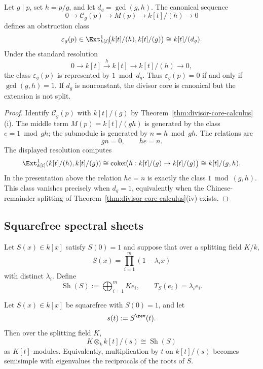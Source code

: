 \begin{corollary}
\label{cor:repeated-roots-extension}
Let \(g\mid p\), set \(h=p/g\), and let \(d_g=\gcd(g,h)\).
The canonical sequence
\[
0\longrightarrow \mathcal C_g(p)\longrightarrow M(p)\longrightarrow k[t]/(h)\longrightarrow 0
\]
defines an obstruction class
\[
\varepsilon_g(p)\in
\Ext^1_{k[t]}\!\bigl(k[t]/(h),k[t]/(g)\bigr)
\cong k[t]/(d_g).
\]
Under the standard resolution
\[
0\longrightarrow k[t]\xrightarrow{\;h\;}k[t]\longrightarrow k[t]/(h)\longrightarrow 0,
\]
the class \(\varepsilon_g(p)\) is represented by \(1\bmod d_g\).
Thus \(\varepsilon_g(p)=0\) if and only if \(\gcd(g,h)=1\).
If \(d_g\) is nonconstant, the divisor core is canonical but the extension is not split.
\end{corollary}

\begin{proof}
Identify \(\mathcal C_g(p)\) with \(k[t]/(g)\) by
Theorem~\ref{thm:divisor-core-calculus}\textup{(i)}.
The middle term \(M(p)=k[t]/(gh)\) is generated by the class \(e=1\bmod gh\);
the submodule is generated by \(n=h\bmod gh\).
The relations are
\[
g n=0,\qquad h e=n.
\]
The displayed resolution computes
\[
\Ext^1_{k[t]}(k[t]/(h),k[t]/(g))
\cong \operatorname{coker}\!\bigl(h:k[t]/(g)\to k[t]/(g)\bigr)
\cong k[t]/(g,h).
\]
In the presentation above the relation \(h e=n\) is exactly the class
\(1\bmod (g,h)\).
This class vanishes precisely when \(d_g=1\), equivalently when the
Chinese-remainder splitting of
Theorem~\ref{thm:divisor-core-calculus}\textup{(iv)} exists.
\end{proof}

\subsection{Squarefree spectral sheets}

\begin{definition}
Let \(S(x)\in k[x]\) satisfy \(S(0)=1\) and suppose that over a splitting field \(K/k\),
\[
S(x)=\prod_{i=1}^m (1-\lambda_i x)
\]
with distinct \(\lambda_i\).
Define
\[
\operatorname{Sh}(S):=\bigoplus_{i=1}^m K e_i,
\qquad
T_S(e_i)=\lambda_i e_i.
\]
\end{definition}

\begin{theorem}
\label{thm:squarefree-sheet}
Let \(S(x)\in k[x]\) be squarefree with \(S(0)=1\), and let
\[
s(t):=S^{\rev}(t).
\]
Then over the splitting field \(K\),
\[
K\otimes_k k[t]/(s)\cong \operatorname{Sh}(S)
\]
as \(K[t]\)-modules.
Equivalently, multiplication by \(t\) on \(k[t]/(s)\) becomes semisimple with eigenvalues the reciprocals of the roots of \(S\).
\end{theorem}

